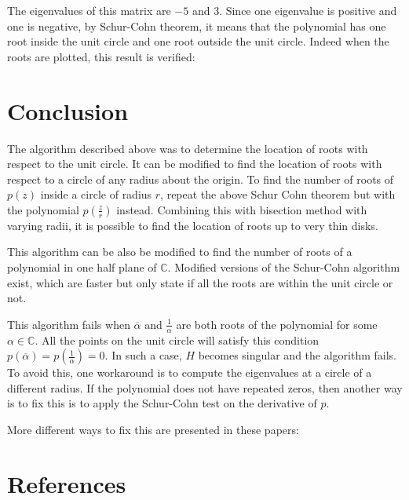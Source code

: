 \documentclass[twoside]{article}
\newcommand*\conj[1]{\overline{#1}}
\theoremstyle{plain}
\theoremstyle{definition}
\theoremstyle{remark}
\begin{document}
The eigenvalues of this matrix are \(-5\) and \(3\). Since one eigenvalue is positive and one is negative, by Schur-Cohn theorem, it means that the polynomial has one root inside the unit circle and one root outside the unit circle. Indeed when the roots are plotted, this result is verified:

\clearpage
\section{Conclusion}

The algorithm described above was to determine the location of roots with respect to the unit circle. It can be modified to find the location of roots with respect to a circle of any radius about the origin. To find the number of roots of \(p(z)\) inside a circle of radius \(r\), repeat the above Schur Cohn theorem but with the polynomial \(p(\frac{z}{r})\) instead. Combining this with bisection method with varying radii, it is possible to find the location of roots up to very thin disks.

This algorithm can be also be modified to find the number of roots of a polynomial in one half plane of \(\mathbb{C}\). Modified versions of the Schur-Cohn algorithm exist, which are faster but only state if all the roots are within the unit circle or not. 

This algorithm fails when \(\conj{\alpha}\) and \(\frac{1}{\alpha}\) are both roots of the polynomial for some \(\alpha \in \mathbb{C}\). All the points on the unit circle will satisfy this condition \(p(\conj{\alpha}) = p(\frac{1}{\alpha}) = 0\). In such a case, \(H\) becomes singular and the algorithm fails.  To avoid this, one workaround is to compute the eigenvalues at a circle of a different radius. If the polynomial does not have repeated zeros, then another way is to fix this is to apply the Schur-Cohn test on the derivative of \(p\).

 More different ways to fix this  are presented in these papers: %

\section*{References}
\end{document}
